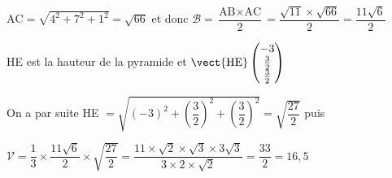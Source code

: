 \begin{enumerate}
$\text{AC}=\sqrt{4^2+7^2+1^2}=\sqrt{66}$ et donc $\mathscr{B}=\dfrac{\text{AB}\times \text{AC}}{2} = \dfrac{\sqrt{11}\times \sqrt{66}}{2}=\dfrac{11\sqrt{6}}{2}$

HE est la hauteur de la pyramide et $\vect{\text{HE}}\begin{pmatrix}-3\\\frac{3}{2}\\\frac{3}{2} \end{pmatrix}$

On a par suite HE $=\sqrt{(-3)^2+\left(\dfrac{3}{2}\right)^2+\left(\dfrac{3}{2}\right)^2}=\sqrt{\dfrac{27}{2}}$ puis

$ \mathscr{V}=\dfrac{1}{3}\times \dfrac{11\sqrt{6}}{2}\times \sqrt{\dfrac{27}{2}} 
=\dfrac{11\times \sqrt{2}\times \sqrt{3}\times 3\sqrt{3}}{3\times 2 \times \sqrt{2}}
=\dfrac{33}{2}
= 16,5$ 
\end{enumerate}
